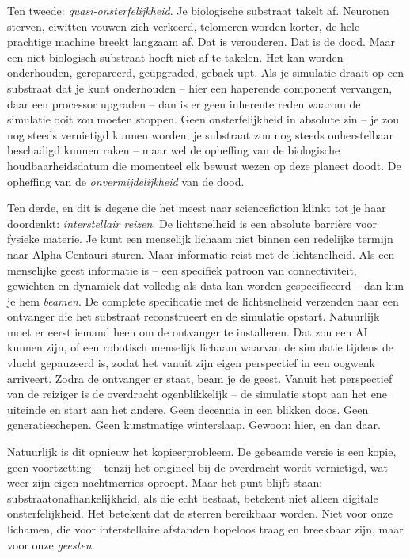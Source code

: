 \documentclass[11pt, twoside, openright]{book}
\begin{document}
Ten tweede: \textit{quasi-onsterfelijkheid}. Je biologische substraat takelt af. Neuronen sterven, eiwitten vouwen zich verkeerd, telomeren worden korter, de hele prachtige machine breekt langzaam af. Dat is verouderen. Dat is de dood. Maar een niet-biologisch substraat hoeft niet af te takelen. Het kan worden onderhouden, gerepareerd, geüpgraded, geback-upt. Als je simulatie draait op een substraat dat je kunt onderhouden -- hier een haperende component vervangen, daar een processor upgraden -- dan is er geen inherente reden waarom de simulatie ooit zou moeten stoppen. Geen onsterfelijkheid in absolute zin -- je zou nog steeds vernietigd kunnen worden, je substraat zou nog steeds onherstelbaar beschadigd kunnen raken -- maar wel de opheffing van de biologische houdbaarheidsdatum die momenteel elk bewust wezen op deze planeet doodt. De opheffing van de \textit{onvermijdelijkheid} van de dood.

Ten derde, en dit is degene die het meest naar sciencefiction klinkt tot je haar doordenkt: \textit{interstellair reizen}. De lichtsnelheid is een absolute barrière voor fysieke materie. Je kunt een menselijk lichaam niet binnen een redelijke termijn naar Alpha Centauri sturen. Maar informatie reist met de lichtsnelheid. Als een menselijke geest informatie is -- een specifiek patroon van connectiviteit, gewichten en dynamiek dat volledig als data kan worden gespecificeerd -- dan kun je hem \textit{beamen}. De complete specificatie met de lichtsnelheid verzenden naar een ontvanger die het substraat reconstrueert en de simulatie opstart. Natuurlijk moet er eerst iemand heen om de ontvanger te installeren. Dat zou een AI kunnen zijn, of een robotisch menselijk lichaam waarvan de simulatie tijdens de vlucht gepauzeerd is, zodat het vanuit zijn eigen perspectief in een oogwenk arriveert. Zodra de ontvanger er staat, beam je de geest. Vanuit het perspectief van de reiziger is de overdracht ogenblikkelijk -- de simulatie stopt aan het ene uiteinde en start aan het andere. Geen decennia in een blikken doos. Geen generatieschepen. Geen kunstmatige winterslaap. Gewoon: hier, en dan daar.

Natuurlijk is dit opnieuw het kopieerprobleem. De gebeamde versie is een kopie, geen voortzetting -- tenzij het origineel bij de overdracht wordt vernietigd, wat weer zijn eigen nachtmerries oproept. Maar het punt blijft staan: substraatonafhankelijkheid, als die echt bestaat, betekent niet alleen digitale onsterfelijkheid. Het betekent dat de sterren bereikbaar worden. Niet voor onze lichamen, die voor interstellaire afstanden hopeloos traag en breekbaar zijn, maar voor onze \textit{geesten}.
\end{document}
